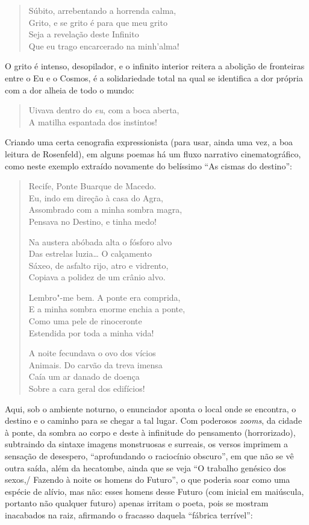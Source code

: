 \begin{verse}
Súbito, arrebentando a horrenda calma,\\
Grito, e se grito é para que meu grito \\
Seja a revelação deste Infinito\\
Que eu trago encarcerado na minh’alma!
\end{verse}

O grito é intenso, desopilador, e o infinito interior reitera a
abolição de fronteiras entre o Eu e o Cosmos, é a solidariedade total
na qual se identifica a dor própria com a dor alheia de todo o mundo:

\begin{verse}
Uivava dentro do \textit{eu}, com a boca aberta,\\
A matilha espantada dos instintos!
\end{verse}

Criando uma certa cenografia expressionista (para usar, ainda uma
vez, a boa leitura de Rosenfeld), em alguns poemas há um fluxo
narrativo cinematográfico, como neste exemplo extraído novamente do
belíssimo “As cismas do destino”:

\begin{verse}
Recife, Ponte Buarque de Macedo.\\
Eu, indo em direção à casa do Agra,\\
Assombrado com a minha sombra magra, \\
Pensava no Destino, e tinha medo!

Na austera abóbada alta o fósforo alvo\\
Das estrelas luzia\ldots{} O calçamento\\
Sáxeo, de asfalto rijo, atro e vidrento,\\
Copiava a polidez de um crânio alvo.

Lembro"-me bem. A ponte era comprida,\\
E a minha sombra enorme enchia a ponte,\\
Como uma pele de rinoceronte\\
Estendida por toda a minha vida!

A noite fecundava o ovo dos vícios\\
Animais. Do carvão da treva imensa\\
Caía um ar danado de doença\\
Sobre a cara geral dos edifícios!
\end{verse}

Aqui, sob o ambiente noturno, o enunciador aponta o local onde se
encontra, o destino e o caminho para se chegar a tal lugar. Com
poderosos \textit{zooms}, da cidade à ponte, da sombra ao corpo e deste
à infinitude do pensamento (horrorizado), subtraindo da sintaxe imagens
monstruosas e surreais, os versos imprimem a sensação de desespero,
“aprofundando o raciocínio obscuro”, em que não se vê outra saída, além
da hecatombe, ainda que se veja “O trabalho genésico dos sexos,/
Fazendo à noite os homens do Futuro”, o que poderia soar como uma
espécie de alívio, mas não: esses homens desse Futuro (com inicial em
maiúscula, portanto não qualquer futuro) apenas irritam o poeta, pois
se mostram inacabados na raiz, afirmando o fracasso daquela “fábrica
terrível”: 

